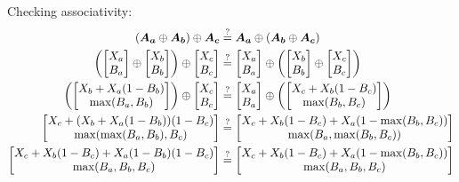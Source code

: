 \documentclass{article}
\newcommand{\aln}[1]{\begin{align*}#1\end{align*}}
\newcommand{\?}{\stackrel{?}{=}}
\begin{document}
\quad Checking associativity:
\aln{
  (\mtx{A_a} \oplus \mtx{A_b}) \oplus \mtx{A_c} &\? \mtx{A_a} \oplus (\mtx{A_b} \oplus \mtx{A_c})\\
  \left(\begin{bmatrix*}X_a\\B_a\end{bmatrix*} \oplus \begin{bmatrix*}X_b\\B_b\end{bmatrix*}\right) \oplus \begin{bmatrix*}X_c\\B_c\end{bmatrix*} &\? \begin{bmatrix*}X_a\\B_a\end{bmatrix*} \oplus \left(\begin{bmatrix*}X_b\\B_b\end{bmatrix*} \oplus \begin{bmatrix*}X_c\\B_c\end{bmatrix*}\right)\\
  \left(\begin{bmatrix*}X_b + X_a(1-B_b)\\\max(B_a, B_b)\end{bmatrix*}\right) \oplus \begin{bmatrix*}X_c\\B_c\end{bmatrix*} &\? \begin{bmatrix*}X_a\\B_a\end{bmatrix*} \oplus \left(\begin{bmatrix*}X_c + X_b(1-B_c)\\\max(B_b, B_c)\end{bmatrix*}\right)\\
  \begin{bmatrix*}X_c + (X_b + X_a(1-B_b))(1-B_c)\\\max(\max(B_a, B_b), B_c) \end{bmatrix*} &\? \begin{bmatrix*}X_c + X_b(1-B_c) + X_a(1 - \max(B_b, B_c))\\\max(B_a, \max(B_b, B_c))\end{bmatrix*}\\
  \begin{bmatrix*}X_c + X_b(1-B_c) + X_a(1-B_b)(1-B_c)\\\max(B_a, B_b, B_c) \end{bmatrix*} &\? \begin{bmatrix*}X_c + X_b(1-B_c) + X_a(1 - \max(B_b, B_c))\\\max(B_a, B_b, B_c)\end{bmatrix*}
}
\end{document}
